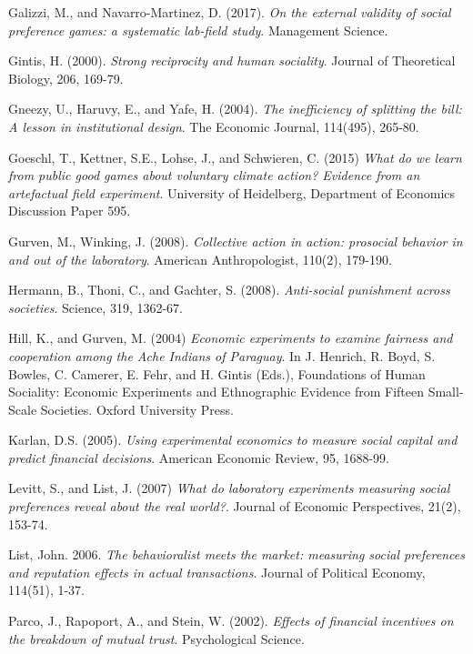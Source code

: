 \documentclass{article}
\begin{document}
\begin{thebibliography}{9}
Galizzi, M., and Navarro-Martinez, D. (2017).
\textit{On the external validity of social preference games: a systematic lab-field study}.
Management Science.

Gintis, H. (2000).
\textit{Strong reciprocity and human sociality}.
Journal of Theoretical Biology, 206, 169-79.

Gneezy, U., Haruvy, E., and Yafe, H. (2004).
\textit{The inefficiency of splitting the bill: A lesson in institutional design}.
The Economic Journal, 114(495), 265-80.

Goeschl, T., Kettner, S.E., Lohse, J., and Schwieren, C. (2015)
\textit{What do we learn from public good games about voluntary climate action? Evidence from an artefactual field experiment}.
University of Heidelberg, Department of Economics Discussion Paper 595.

Gurven, M., Winking, J. (2008).
\textit{Collective action in action: prosocial behavior in and out of the laboratory}.
American Anthropologist, 110(2), 179-190. 

Hermann, B., Thoni, C., and Gachter, S. (2008).
\textit{Anti-social punishment across societies}.
Science, 319, 1362-67.

Hill, K., and Gurven, M. (2004)
\textit{Economic experiments to examine fairness and cooperation among the Ache Indians of Paraguay}.
In J. Henrich, R. Boyd, S. Bowles, C. Camerer, E. Fehr, and H. Gintis (Eds.),
Foundations of Human Sociality: Economic Experiments and Ethnographic Evidence from Fifteen Small-Scale Societies. Oxford University Press.

Karlan, D.S. (2005).
\textit{Using experimental economics to measure social capital and predict financial decisions}.
American Economic Review, 95, 1688-99.

Levitt, S., and List, J. (2007)
\textit{What do laboratory experiments measuring social preferences reveal about the real world?}.
Journal of Economic Perspectives, 21(2), 153-74.


List, John. 2006.
\textit{The behavioralist meets the market: measuring social preferences and reputation effects in actual transactions}.
Journal of Political Economy, 114(51), 1-37.


Parco, J., Rapoport, A., and Stein, W. (2002).
\textit{Effects of financial incentives on the breakdown of mutual trust}.
Psychological Science.


\end{thebibliography}
\end{document}
